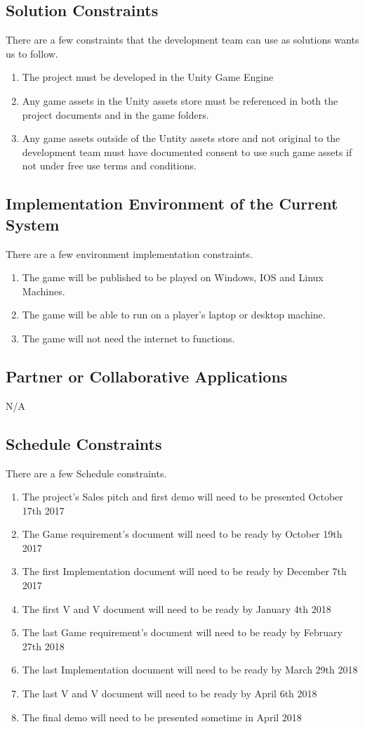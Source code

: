 \documentclass{article}
\begin{document}
\subsection{Solution Constraints}
\quad There are a few constraints that the development team can use as solutions wants us to follow.
\begin{enumerate}[{SC}1. ]
	\item The project must be developed in the Unity Game Engine
	\item Any game assets in the Unity assets store must be referenced in both the project documents and in the game folders. 
	\item Any game assets outside of the Untity assets store and not original to the development team must have documented consent to use such game assets if not under free use terms and conditions.
\end{enumerate}
\subsection{Implementation Environment of the Current System}
\quad There are a few environment implementation constraints.
\begin{enumerate}[{IE}1. ]
	\item The game will be published to be played on Windows, IOS and Linux Machines.
	\item The game will be able to run on a player's laptop or desktop machine. 
	\item The game will not need the internet to functions.
\end{enumerate}
\subsection{Partner or Collaborative Applications}
N/A
\subsection{Schedule Constraints}
\quad There are a few Schedule constraints.
\begin{enumerate}[{SC}1. ]
	\item The project's  Sales pitch and first demo will need to be presented October 17th 2017
	\item The Game requirement's document will need to be ready by October 19th 2017
	\item The first Implementation document will need to be ready by December 7th 2017
	\item The first V and V document will need to be ready by January 4th 2018
	\item The last Game requirement's document will need to be ready by February 27th 2018
	\item The last Implementation document will need to be ready by March 29th 2018
	\item The last V and V document will need to be ready by April 6th 2018
	\item The final demo will need to be presented sometime in April 2018
\end{enumerate}
\end{document}
